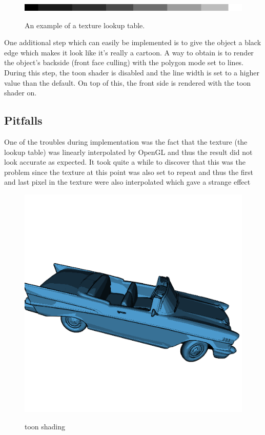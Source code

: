 \documentclass[a4paper,12pt]{article}
\begin{document}
\begin{figure}[h]
  \begin{center}
		\scalebox{0.5} {\includegraphics[width=512px]{images/lightmap.png}}
    \caption{An example of a texture lookup table.}
    \label{fig:TextureLUT}
  \end{center}
\end{figure}


One additional step which can easily be implemented is to give the object a black edge which makes it look like it's really a cartoon. A way to obtain is to render the object's backside (front face culling) with the polygon mode set to lines. During this step, the toon shader is disabled and the line width is set to a higher value than the default. On top of this, the front side is rendered with the toon shader on.

\subsection{Pitfalls}
\label{sec:PitfallsToonShader}

One of the troubles during implementation was the fact that the texture (the lookup table) was linearly interpolated by OpenGL and thus the result did not look accurate as expected. It took quite a while to discover that this was the problem since the texture at this point was also set to repeat and thus the first and last pixel in the texture were also interpolated which gave a strange effect


\begin{figure}[htbp]
  \begin{center}
		\scalebox{0.5} {\includegraphics[width=512px]{images/toon.png}}
    \caption{toon shading}
    \label{fig:toonShading}
  \end{center}
\end{figure}
\end{document}
